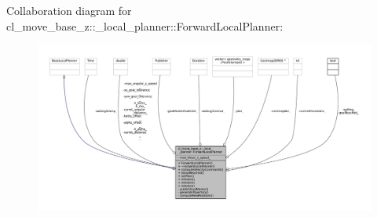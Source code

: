 Collaboration diagram for cl\+\_\+move\+\_\+base\+\_\+z\+:\+:\+\_\+local\+\_\+planner\+:\+:Forward\+Local\+Planner\+:
\nopagebreak
\begin{figure}[H]
\begin{center}
\leavevmode
\includegraphics[width=350pt]{classcl__move__base__z_1_1__local__planner_1_1ForwardLocalPlanner__coll__graph}
\end{center}
\end{figure}
